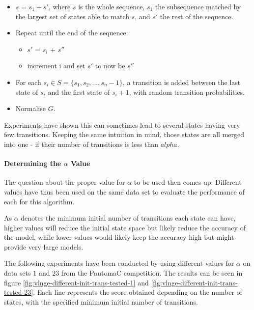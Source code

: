 \begin{itemize}
	\item $s$ = $s_1 + s'$, where $s$ is the whole sequence, $s_1$ the subsequence matched by the largest set of states able to match $s$, and $s'$ the rest of the sequence.
	\item Repeat until the end of the sequence:
	\begin{itemize}
		\item $s'$ = $s_i$ + $s''$
		\item increment i and set $s'$ to now be $s''$
	\end{itemize}
	\item For each $s_i \in S = \{s_1, s_2, ... , s_n-1\}$, a transition is added between the last state of $s_i$ and the first state of $s_i+1$, with random transition probabilities.
	\item Normalise $G$.
\end{itemize}

Experiments have shown this can sometimes lead to several states having very few transitions. Keeping the same intuition in mind, those states are all merged into one - if their number of transitions is less than $alpha$.

\paragraph{Determining the $\alpha$ Value}

The question about the proper value for $\alpha$ to be used then comes up. Different values have thus been used on the same data set to evaluate the performance of each for this algorithm.

As $\alpha$ denotes the minimum initial number of transitions each state can have, higher values will reduce the initial state space but likely reduce the accuracy of the model, while lower values would likely keep the accuracy high but might provide very large models.

The following experiments have been conducted by using different values for $\alpha$ on data sets $1$ and $23$ from the PautomaC competition. The results can be seen in figure \ref{fig:vlnge-different-init-trans-tested-1} and \ref{fig:vlnge-different-init-trans-tested-23}. Each line represents the score obtained depending on the number of states, with the specified minimum initial number of transitions.


